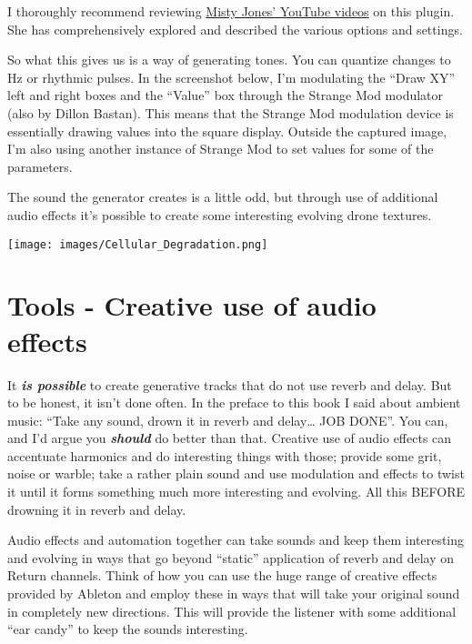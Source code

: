 \documentclass[
  12pt,
  letterpaper,
  oneside,
  open=any]{scrbook}
\begin{document}
I thoroughly recommend reviewing
\href{https://www.youtube.com/watch?v=dM2ksxavJzI}{Misty Jones' YouTube
videos} on this plugin. She has comprehensively explored and described
the various options and settings.

So what this gives us is a way of generating tones. You can quantize
changes to Hz or rhythmic pulses. In the screenshot below, I'm
modulating the ``Draw XY'' left and right boxes and the ``Value'' box
through the Strange Mod modulator (also by Dillon Bastan). This means
that the Strange Mod modulation device is essentially drawing values
into the square display. Outside the captured image, I'm also using
another instance of Strange Mod to set values for some of the
parameters.

The sound the generator creates is a little odd, but through use of
additional audio effects it's possible to create some interesting
evolving drone textures.

\texttt{[image: images/Cellular\_Degradation.png]}


\chapter{Tools - Creative use of audio
effects}\label{Chapter-015-Tools-Audio_Effects}

It \textbf{\emph{is possible}} to create generative tracks that do not
use reverb and delay. But to be honest, it isn't done often. In the
preface to this book I said about ambient music: ``Take any sound, drown
it in reverb and delay\ldots{} JOB DONE''. You can, and I'd argue you
\textbf{\emph{should}} do better than that. Creative use of audio
effects can accentuate harmonics and do interesting things with those;
provide some grit, noise or warble; take a rather plain sound and use
modulation and effects to twist it until it forms something much more
interesting and evolving. All this BEFORE drowning it in reverb and
delay.

\begin{tcolorbox}[enhanced jigsaw, colback=white, rightrule=.15mm, toprule=.15mm, arc=.35mm, opacitybacktitle=0.6, coltitle=black, leftrule=.75mm, bottomtitle=1mm, toptitle=1mm, left=2mm, bottomrule=.15mm, titlerule=0mm, colbacktitle=quarto-callout-tip-color!10!white, colframe=quarto-callout-tip-color-frame, title=\textcolor{quarto-callout-tip-color}{\faLightbulb}\hspace{0.5em}{Key idea}, breakable, opacityback=0]

Audio effects and automation together can take sounds and keep them
interesting and evolving in ways that go beyond ``static'' application
of reverb and delay on Return channels. Think of how you can use the
huge range of creative effects provided by Ableton and employ these in
ways that will take your original sound in completely new directions.
This will provide the listener with some additional ``ear candy'' to
keep the sounds interesting.

\end{tcolorbox}
\end{document}
